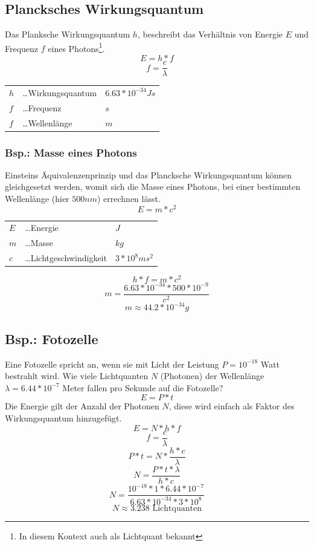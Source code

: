 \documentclass[a4paper,11pt]{article}
\begin{document}
\subsection{Plancksches Wirkungsquantum}
Das Planksche Wirkungsquantum $h$, beschreibt das Verhältnis von Energie $E$ und Frequenz $f$ eines Photons\footnote{In diesem Kontext auch als Lichtquant bekannt}.
$$E = h * f$$
$$f = \frac{c}{\lambda}$$
\begin{center}
    \begin{tabular}{l l l}
        $h$ &\dots Wirkungsquantum & $6.63 * 10^{-34} Js$\\
        $f$ &\dots Frequenz & ${s}$\\
        $f$ &\dots Wellenlänge & ${m}$
    \end{tabular}
\end{center}

\subsubsection{Bsp.: Masse eines Photons}
Einsteins Äquivalenzenprinzip und das Plancksche Wirkungsquantum können gleichgesetzt werden, womit sich die Masse eines Photons, bei einer bestimmten Wellenlänge (hier $500nm$) errechnen lässt.
$$E = m * c^2$$
\begin{center}
    \begin{tabular}{l l l}
        $E$ &\dots Energie & $J$\\
        $m$ &\dots Masse & $kg$\\
        $c$ &\dots Lichtgeschwindigkeit & $3*10^8 {m}{s^2}$
    \end{tabular}
\end{center}
\vspace{0.8 em}
$$h * f = m * c^2$$
$$m = \frac{6.63 * 10^{-34} * 500 * 10^{-9}}{c^2}$$
$$m \approx 44.2 * 10^{-34}g $$

\newpage
\subsection{Bsp.: Fotozelle}
Eine Fotozelle spricht an, wenn sie mit Licht der Leistung $P = 10^{-18}$ Watt bestrahlt wird.
Wie viele Lichtquanten $N$ (Photonen) der Wellenlänge $\lambda = 6.44 * 10^{-7}$ Meter fallen pro Sekunde auf die Fotozelle?
$$E = P*t$$
Die Energie gilt der Anzahl der Photonen $N$, diese wird einfach als Faktor des Wirkungsquantum hinzugefügt.
$$E = N * h*f$$
$$f = \frac{c}{\lambda}$$
$$P*t = N * \frac{h * c}{\lambda}$$
$$N = \frac{P*t*\lambda}{h*c}$$
$$N = \frac{10^{-18}*1*6.44*10^{-7}}{6.63*10^{-34}*3*10^8}$$
\vspace{0.8 em}
$$N \approx 3.238 \text{ Lichtquanten}$$
\end{document}
